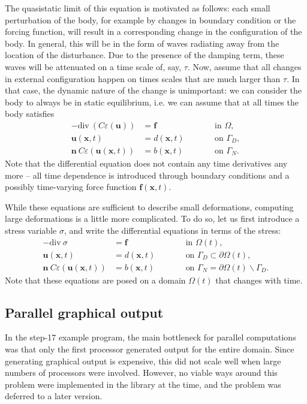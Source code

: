 \documentclass{article}
\renewcommand{\vec}[1]{\mathbf{#1}}
\renewcommand{\div}{\mathrm{div}\ }
\begin{document}
The quasistatic limit of this equation is motivated as follows: each small
perturbation of the body, for example by changes in boundary condition or the
forcing function, will result in a corresponding change in the configuration
of the body. In general, this will be in the form of waves radiating away from
the location of the disturbance. Due to the presence of the damping term,
these waves will be attenuated on a time scale of, say, $\tau$. Now, assume
that all changes in external configuration happen on times scales that are
much larger than $\tau$. In that case, the dynamic nature of the change is
unimportant: we can consider the body to always be in static equilibrium,
i.e. we can assume that at all times the body satisfies
\begin{align*}
  - \div ( C \varepsilon(\vec u)) &= \vec f
  &&\text{in $\Omega$},
  \\
  \vec u(\vec x,t) &= d(\vec x,t)
  \qquad
  &&\text{on $\Gamma_D$},
  \\
  \vec n \ C \varepsilon(\vec u(\vec x,t)) &= b(\vec x,t)
  \qquad
  &&\text{on $\Gamma_N$}.
\end{align*}
Note that the differential equation does not contain any time derivatives any
more -- all time dependence is introduced through boundary conditions and a
possibly time-varying force function $\vec f(\vec x,t)$.

While these equations are sufficient to describe small deformations, computing
large deformations is a little more complicated. To do so, let us first
introduce a stress variable $\sigma$, and write the differential equations in
terms of the stress:
\begin{align*}
  - \div \sigma &= \vec f
  &&\text{in $\Omega(t)$},
  \\
  \vec u(\vec x,t) &= d(\vec x,t)
  \qquad
  &&\text{on $\Gamma_D\subset\partial\Omega(t)$},
  \\
  \vec n \ C \varepsilon(\vec u(\vec x,t)) &= b(\vec x,t)
  \qquad
  &&\text{on $\Gamma_N=\partial\Omega(t)\backslash\Gamma_D$}.
\end{align*}
Note that these equations are posed on a domain $\Omega(t)$ that changes with
time.


\subsection*{Parallel graphical output}

In the step-17 example program, the main bottleneck for parallel computations
was that only the first processor generated output for the entire domain.
Since generating graphical output is expensive, this did not scale well when
large numbers of processors were involved. However, no viable ways around this
problem were implemented in the library at the time, and the problem was
deferred to a later version.
\end{document}
